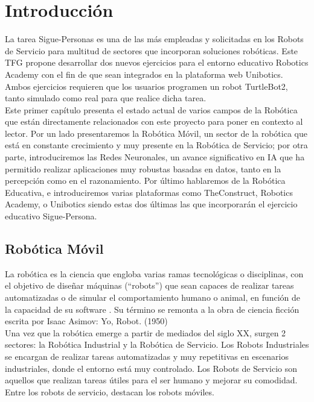 \chapter{Introducción}
\label{cap:capitulo1}
\setcounter{page}{1}
\pagestyle{plain}

La tarea Sigue-Personas es una de las más empleadas y solicitadas en los Robots de Servicio para multitud de sectores que incorporan soluciones robóticas. Este TFG propone desarrollar dos nuevos ejercicios para el entorno educativo Robotics Academy con el fin de que sean integrados en la plataforma web Unibotics. Ambos ejercicios requieren que los usuarios programen un robot TurtleBot2, tanto simulado como real para que realice dicha tarea.\\

Este primer capítulo presenta el estado actual de varios campos de la Robótica que están directamente relacionados con este proyecto para poner en contexto al lector. Por un lado presentaremos la Robótica Móvil, un sector de la robótica que está en constante crecimiento y muy presente en la Robótica de Servicio; por otra parte, introduciremos las Redes Neuronales, un avance significativo en IA que ha permitido realizar aplicaciones muy robustas basadas en datos, tanto en la percepción como en el razonamiento. Por último hablaremos de la Robótica Educativa, e introduciremos varias plataformas como TheConstruct, Robotics Academy, o Unibotics siendo estas dos últimas las que incorporarán el ejercicio educativo Sigue-Persona.




\section{Robótica Móvil}
\label{sec:robotica_movil}

La robótica es la ciencia que engloba varias ramas tecnológicas o disciplinas, con el objetivo de diseñar máquinas (``robots'') que sean capaces de realizar tareas automatizadas o de simular el comportamiento humano o animal, en función de la capacidad de su software \cite{revistaderobots}. Su término se remonta a la obra de ciencia ficción escrita por Isaac Asimov: Yo, Robot. (1950)\\

Una vez que la robótica emerge a partir de mediados del siglo XX, surgen 2 sectores: la Robótica Industrial y la Robótica de Servicio. Los Robots Industriales se encargan de realizar tareas automatizadas y muy repetitivas en escenarios industriales, donde el entorno está muy controlado. Los Robots de Servicio son aquellos que realizan tareas útiles para el ser humano y mejorar su comodidad. Entre los robots de servicio, destacan los robots móviles.\\

